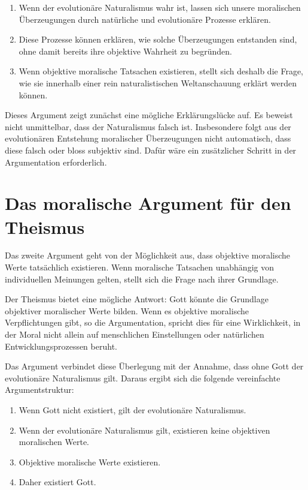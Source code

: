 \documentclass[11pt,a4paper]{article}
\begin{document}
	\begin{tcolorbox}[title=Argument gegen den evolutionären Naturalismus]
		\begin{enumerate}[leftmargin=*]
			\item Wenn der evolutionäre Naturalismus wahr ist, lassen sich unsere moralischen Überzeugungen durch natürliche und evolutionäre Prozesse erklären.
			\item Diese Prozesse können erklären, wie solche Überzeugungen entstanden sind, ohne damit bereits ihre objektive Wahrheit zu begründen.
			\item Wenn objektive moralische Tatsachen existieren, stellt sich deshalb die Frage, wie sie innerhalb einer rein naturalistischen Weltanschauung erklärt werden können.
		\end{enumerate}
	\end{tcolorbox}
	
	Dieses Argument zeigt zunächst eine mögliche Erklärungslücke auf. Es beweist nicht unmittelbar, dass der Naturalismus falsch ist. Insbesondere folgt aus der evolutionären Entstehung moralischer Überzeugungen nicht automatisch, dass diese falsch oder bloss subjektiv sind. Dafür wäre ein zusätzlicher Schritt in der Argumentation erforderlich.
	
	\section{Das moralische Argument für den Theismus}
	
	Das zweite Argument geht von der Möglichkeit aus, dass objektive moralische Werte tatsächlich existieren. Wenn moralische Tatsachen unabhängig von individuellen Meinungen gelten, stellt sich die Frage nach ihrer Grundlage.
	
	Der Theismus bietet eine mögliche Antwort: Gott könnte die Grundlage objektiver moralischer Werte bilden. Wenn es objektive moralische Verpflichtungen gibt, so die Argumentation, spricht dies für eine Wirklichkeit, in der Moral nicht allein auf menschlichen Einstellungen oder natürlichen Entwicklungsprozessen beruht.
	
	Das Argument verbindet diese Überlegung mit der Annahme, dass ohne Gott der evolutionäre Naturalismus gilt. Daraus ergibt sich die folgende vereinfachte Argumentstruktur:
	
	\begin{tcolorbox}[title=Vereinfachte Struktur des moralischen Arguments]
		\begin{enumerate}[leftmargin=*]
			\item Wenn Gott nicht existiert, gilt der evolutionäre Naturalismus.
			\item Wenn der evolutionäre Naturalismus gilt, existieren keine objektiven moralischen Werte.
			\item Objektive moralische Werte existieren.
			\item Daher existiert Gott.
		\end{enumerate}
	\end{tcolorbox}
	
\end{document}
